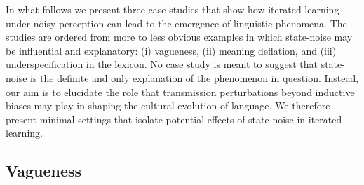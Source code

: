 \documentclass[10pt,a4paper]{article}
\newcommand{\mf}[1]{\textcolor{Red}{[MF: #1]}}
\newcommand{\citeposs}[2][]{\citeauthor{#2}'s (\citeyear[#1]{#2})}
\begin{document}
In what follows we present three case studies that show how iterated learning under noisy
perception can lead to the emergence of linguistic phenomena. The 
studies are ordered from more to less obvious examples in which state-noise may be influential
and explanatory: (i) vagueness, (ii) meaning deflation, and (iii) underspecification in the
lexicon.
No case study is meant to suggest that state-noise is the definite and only explanation of the
phenomenon in question. Instead, our aim is to elucidate the role that transmission perturbations beyond
inductive biases may play in shaping the cultural evolution of language. We therefore present
minimal settings that isolate potential effects of state-noise in iterated learning.


\subsection{Vagueness}
\end{document}

